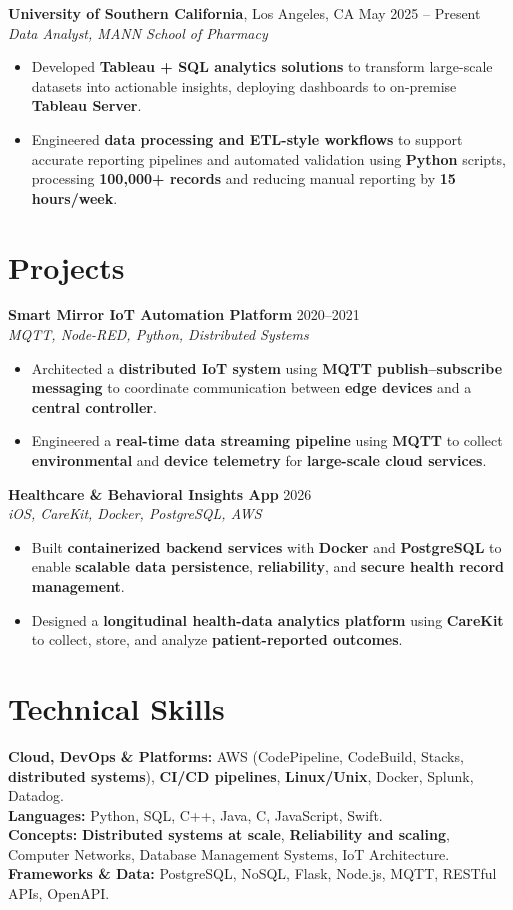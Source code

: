 \documentclass[letterpaper,11pt]{article}
\begin{document}
\textbf{University of Southern California}, Los Angeles, CA \hfill May 2025 -- Present \\
\textit{Data Analyst, MANN School of Pharmacy}
\begin{itemize}
    \item Developed \textbf{Tableau + SQL analytics solutions} to transform large-scale datasets into actionable insights, deploying dashboards to on-premise \textbf{Tableau Server}.
    \item Engineered \textbf{data processing and ETL-style workflows} to support accurate reporting pipelines and automated validation using \textbf{Python} scripts, processing \textbf{100,000+ records} and reducing manual reporting by \textbf{15 hours/week}.
\end{itemize}

\section*{Projects}
\textbf{Smart Mirror IoT Automation Platform} \hfill 2020--2021 \\
\textit{MQTT, Node-RED, Python, Distributed Systems}
\begin{itemize}
    \item Architected a \textbf{distributed IoT system} using \textbf{MQTT publish–subscribe messaging} to coordinate communication between \textbf{edge devices} and a \textbf{central controller}.
    \item Engineered a \textbf{real-time data streaming pipeline} using \textbf{MQTT} to collect \textbf{environmental} and \textbf{device telemetry} for \textbf{large-scale cloud services}.
\end{itemize}
\textbf{Healthcare \& Behavioral Insights App} \hfill 2026 \\
\textit{iOS, CareKit, Docker, PostgreSQL, AWS}
\begin{itemize}
    \item Built \textbf{containerized backend services} with \textbf{Docker} and \textbf{PostgreSQL} to enable \textbf{scalable data persistence}, \textbf{reliability}, and \textbf{secure health record management}.
    \item Designed a \textbf{longitudinal health-data analytics platform} using \textbf{CareKit} to collect, store, and analyze \textbf{patient-reported outcomes}.
\end{itemize}

\section*{Technical Skills}
\textbf{Cloud, DevOps \& Platforms:} AWS (CodePipeline, CodeBuild, Stacks, \textbf{distributed systems}), \textbf{CI/CD pipelines}, \textbf{Linux/Unix}, Docker, Splunk, Datadog. \\
\textbf{Languages:} Python, SQL, C++, Java, C, JavaScript, Swift. \\
\textbf{Concepts:} \textbf{Distributed systems at scale}, \textbf{Reliability and scaling}, Computer Networks, Database Management Systems, IoT Architecture. \\
\textbf{Frameworks \& Data:} PostgreSQL, NoSQL, Flask, Node.js, MQTT, RESTful APIs, OpenAPI.
\end{document}
